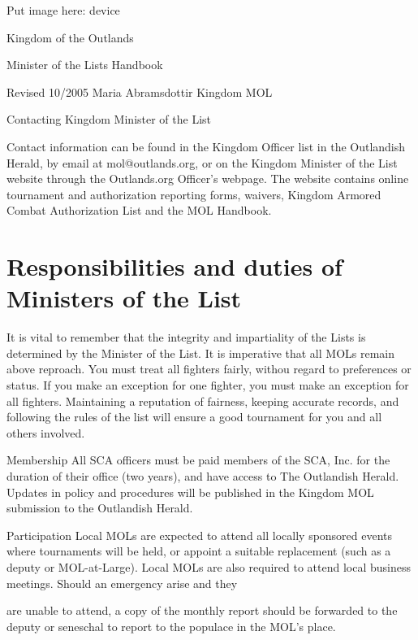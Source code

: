 \documentclass{article}
\begin{document}
Put image here: device


\begin{center}
{\Huge
Kingdom of the Outlands

Minister of the Lists
Handbook

}\end{center}



Revised 10/2005
Maria Abramsdottir
Kingdom MOL



\tableofcontents Contacting Kingdom Minister of the List

Contact information can be found in the Kingdom Officer list in the Outlandish Herald, by email at
mol@outlands.org, or on the Kingdom Minister of the List website through the Outlands.org
Officer’s webpage. The website contains online tournament and authorization reporting forms,
waivers, Kingdom Armored Combat Authorization List and the MOL Handbook.


\section{Responsibilities and duties of Ministers of the List}

It is vital to remember that the integrity and impartiality of the Lists is determined by the Minister of the
List. It is imperative that all MOLs remain above reproach.
You must treat all fighters fairly, withou regard to preferences or status.
If you make an exception for one fighter, you must make an exception
for all fighters. Maintaining a reputation of fairness, keeping accurate records, and following the rules
of the list will ensure a good tournament for you and all others involved.


Membership All SCA officers must be paid members of the SCA, Inc. for the duration of their office
(two years), and have access to The Outlandish Herald. Updates in policy and procedures
will be published in the Kingdom MOL submission to the Outlandish Herald.


Participation Local MOLs are expected to attend all locally sponsored events where tournaments will be
held, or appoint a suitable replacement (such as a deputy or MOL-at-Large). Local MOLs
are also required to attend local business meetings. Should an emergency arise and they

are unable to attend, a copy of the monthly report should be forwarded to the deputy or
seneschal to report to the populace in the MOL’s place.
\end{document}
